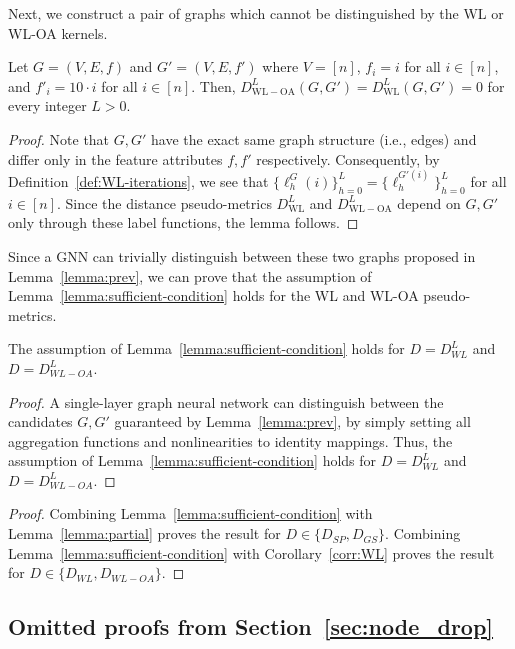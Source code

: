 Next, we construct a pair of graphs which cannot be distinguished by the WL or WL-OA kernels. 
\begin{lemma}\label{lemma:prev} Let $G = (V, E, f)$ and $G' = (V, E, f')$ where $V = [n]$, $f_i = i$ for all $i \in [n]$, and $f'_i = 10\cdot i$ for all $i \in [n]$. Then, $D^L_{\mathrm{WL-OA}}(G, G') = D^L_{\mathrm{WL}}(G, G') = 0$ for every integer $L > 0$. 
\end{lemma}
\begin{proof} Note that $G, G'$ have the exact same graph structure (i.e., edges) and differ only in the feature attributes $f, f'$ respectively. Consequently, by Definition~\ref{def:WL-iterations}, we see that $\{\ell_h^G(i)\}_{h=0}^L = \{\ell_h^{G'(i)}\}_{h=0}^L$ for all $i \in [n]$. Since the distance pseudo-metrics $D^L_{\mathrm{WL}}$ and $D^L_{\mathrm{WL-OA}}$ depend on $G, G'$ only through these label functions, the lemma follows.
\end{proof}

Since a GNN can trivially distinguish between these two graphs proposed in Lemma~\ref{lemma:prev}, we can prove that the assumption of Lemma~\ref{lemma:sufficient-condition} holds for the WL and WL-OA pseudo-metrics. 

\begin{corollary}\label{corr:WL}The assumption of Lemma~\ref{lemma:sufficient-condition} holds for $D = D^L_{WL}$ and $D = D^L_{WL-OA}$. 
\end{corollary}
\begin{proof} A single-layer graph neural network can distinguish between the candidates $G, G'$ guaranteed by Lemma~\ref{lemma:prev}, by simply setting all aggregation functions and nonlinearities to identity mappings. Thus, the assumption of Lemma~\ref{lemma:sufficient-condition} holds for $D = D^L_{WL}$ and $D = D^L_{WL-OA}$. 
\end{proof}

\tmdneeded*
\begin{proof} Combining Lemma~\ref{lemma:sufficient-condition} with Lemma~\ref{lemma:partial} proves the result for $D \in \{D_{SP}, D_{GS}\}$.  Combining Lemma~\ref{lemma:sufficient-condition} with Corollary~\ref{corr:WL} proves the result for $D \in \{D_{WL}, D_{WL-OA}\}$. 
\end{proof}

\subsection{Omitted proofs from Section~\ref{sec:node_drop}}\label{sec:apx-node}

